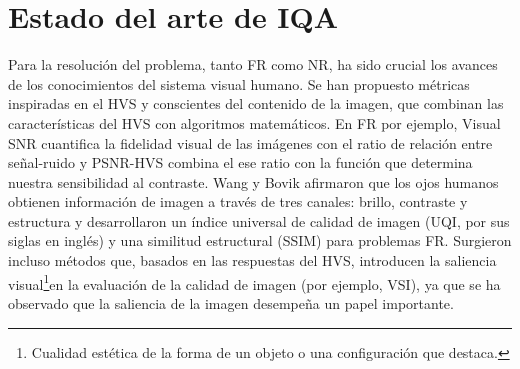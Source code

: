 \section{Estado del arte de IQA}
Para la resolución del problema, tanto FR como NR, ha sido crucial los avances de los conocimientos 
del sistema visual humano. Se han propuesto métricas inspiradas en el HVS y 
conscientes del contenido de la imagen, que combinan las características del HVS 
con algoritmos matemáticos. En FR por ejemplo, Visual SNR\cite{VSNR} cuantifica 
la fidelidad visual de las imágenes con el ratio de relación entre señal-ruido y 
PSNR-HVS\cite{PSNR-HVS} combina el ese ratio con la función que determina 
nuestra sensibilidad al contraste. 
Wang y Bovik afirmaron que los ojos humanos obtienen información de imagen a 
través de tres canales: brillo, contraste y estructura\cite{SSIM} y desarrollaron 
un índice universal de calidad de imagen (UQI, por sus siglas en inglés) \cite{UQI} y una similitud 
estructural (SSIM)\cite{SSIM} para problemas FR. Surgieron incluso métodos que, basados en las 
respuestas del HVS, introducen la saliencia visual\footnote{
  Cualidad estética de la forma de un objeto o una configuración que destaca.
}en la evaluación de la calidad de imagen (por ejemplo, VSI)\cite{VSI}, 
ya que se ha observado que la saliencia de la imagen desempeña un papel importante.

